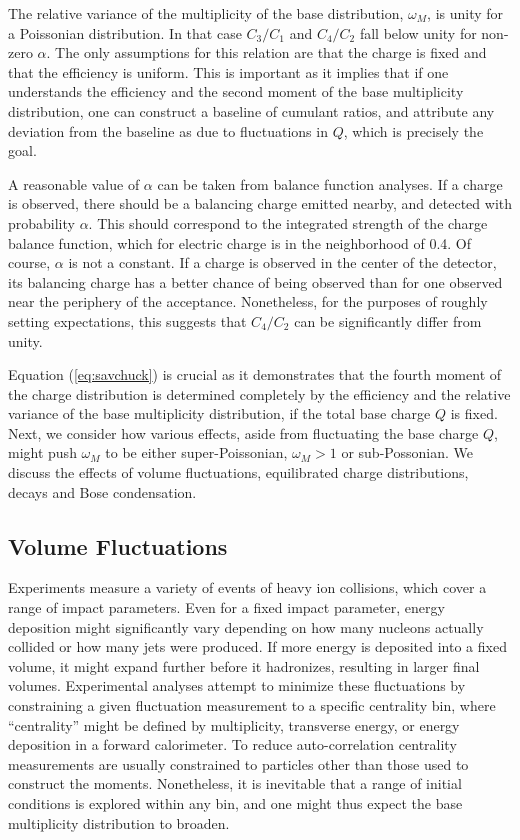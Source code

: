 \documentclass[aps,prc,nofootinbib,showpacs,superscriptaddress,groupedaddress]{revtex4-1}
\begin{document}
The relative variance of the multiplicity of the base distribution, $\omega_M$, is unity for a Poissonian distribution. In that case $C_3/C_1$ and $C_4/C_2$ fall below unity for non-zero $\alpha$. The only assumptions for this relation are that the charge is fixed and that the efficiency is uniform. This is important as it implies that if one understands the efficiency and the second moment of the base multiplicity distribution, one can construct a baseline of cumulant ratios, and attribute any deviation from the baseline as due to fluctuations in $Q$, which is precisely the goal.

A reasonable value of $\alpha$ can be taken from balance function analyses. If a charge is observed, there should be a balancing charge emitted nearby, and detected with probability $\alpha$. This should correspond to the integrated strength of the charge balance function, which for electric charge is in the neighborhood of 0.4. Of course, $\alpha$ is not a constant. If a charge is observed in the center of the detector, its balancing charge has a better chance of being observed than for one observed near the periphery of the acceptance. Nonetheless, for the purposes of roughly setting expectations, this suggests that $C_4/C_2$ can be significantly differ from unity. 

Equation (\ref{eq:savchuck}) is crucial as it demonstrates that the fourth moment of the charge distribution is determined completely by the efficiency and the relative variance of the base multiplicity distribution, if the total base charge $Q$ is fixed. Next, we consider how various effects, aside from fluctuating the base charge $Q$, might push $\omega_M$ to be either super-Poissonian, $\omega_M>1$ or sub-Possonian. We discuss the effects of volume fluctuations, equilibrated charge distributions, decays and Bose condensation.

\subsection{Volume Fluctuations}

Experiments measure a variety of events of heavy ion collisions, which cover a range of impact parameters. Even for a fixed impact parameter, energy deposition might significantly vary depending on how many nucleons actually collided or how many jets were produced. If more energy is deposited into a fixed volume, it might expand further before it hadronizes, resulting in larger final volumes. Experimental analyses attempt to minimize these fluctuations by constraining a given fluctuation measurement to a specific centrality bin, where ``centrality'' might be defined by multiplicity, transverse energy, or energy deposition in a forward calorimeter. To reduce auto-correlation centrality measurements are usually constrained to particles other than those used to construct the moments. Nonetheless, it is inevitable that a range of initial conditions is explored within any bin, and one might thus expect the base multiplicity distribution to broaden.
\end{document}
